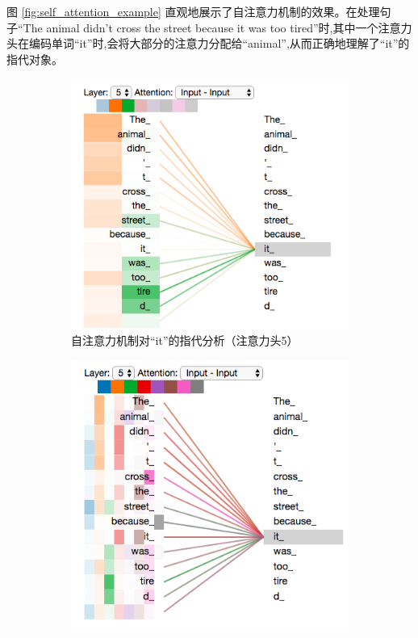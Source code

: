 图 \ref{fig:self_attention_example} 直观地展示了自注意力机制的效果。在处理句子“The animal didn't cross the street because it was too tired”时,其中一个注意力头在编码单词“it”时,会将大部分的注意力分配给“animal”,从而正确地理解了“it”的指代对象。
\begin{figure}[H]
    \centering
    \begin{subfigure}[b]{0.48\textwidth}
        \centering
        \includegraphics[width=\textwidth]{figures/T5.png}
        \caption{自注意力机制对“it”的指代分析（注意力头5）}
        \label{fig:self_attention_it_1}
    \end{subfigure}
    \hfill
    \begin{subfigure}[b]{0.48\textwidth}
        \centering
        \includegraphics[width=\textwidth]{figures/T6.png}

\end{subfigure}
\end{figure}
